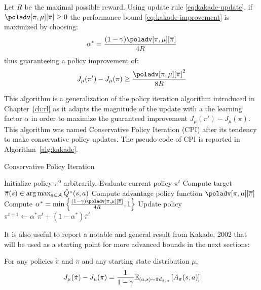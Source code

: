 \begin{theorem}
Let $R$ be the maximal possible reward. Using update rule \ref{eq:kakade-update}, if $\poladv[\pi, \mu][\overline{\pi}] \geq 0$ the performance bound \ref{eq:kakade-improvement} is maximized by choosing:
\begin{equation}
\alpha^* = \frac{(1-\gamma)\poladv[\pi, \mu][\overline{\pi}]}{4R}
\end{equation}
thus guaranteeing a policy improvement of:
\begin{equation}
J_{\mu}(\pi') - J_{\mu}(\pi) \geq \frac{{\poladv[\pi, \mu][\overline{\pi}]}^2}{8R}
\end{equation}
\end{theorem}

This algorithm is a generalization of the policy iteration algorithm introduced in Chapter~\ref{ch:rl} as it adapts the magnitude of the update with a the learning factor $\alpha$ in order to maximize the guaranteed improvement $J_\mu(\pi') - J_\mu(\pi)$. This algorithm was named Conservative Policy Iteration (CPI) after its tendency to make conservative policy updates. The pseudo-code of CPI is reported in Algorithm~\ref{alg:kakade}. 

\begin{algorithm}[t]
\caption{Conservative Policy Iteration}\label{alg:kakade}
\begin{algorithmic}
\State Initialize policy $\pi^0$ arbitrarily.
\State Evaluate current policy $\pi^t$
\State Compute target $\overline{\pi}(s)\in\arg\max_{a\in\aspace}{\hat{Q}^\pi (s,a)}$
\State Compute advantage policy function $\poladv[\pi,\mu][\overline{\pi}]$
\State Compute $\alpha^* = \min\left\{ \frac{(1-\gamma)\poladv[\pi, \mu][\overline{\pi}]}{4R}, 1 \right\}$
\State Update policy $\pi^{t+1} \gets \alpha^* \pi^t + (1 - \alpha^*)\overline{\pi}^t$
\EndFor
\end{algorithmic}
\end{algorithm}

It is also useful to report a notable and general result from Kakade, 2002 that will be used as a starting point for more advanced bounds in the next sections: 
\begin{theorem}\label{th:kakade-lemma6.1}
For any policies $\tilde{\pi}$ and $\pi$ and any starting state distribution $\mu$,
\begin{equation}
J_{\mu}(\tilde{\pi}) - J_{\mu}(\pi) = \frac{1}{1-\gamma}\EV[(a,s)\sim\tilde{\pi}d_{\tilde{\pi}, \mu}]{A_{\pi}(s,a)} 
\end{equation} 
\end{theorem}

